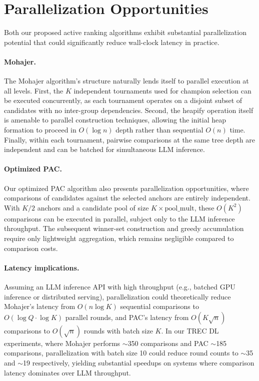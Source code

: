 \documentclass[11pt]{article}
\begin{document}
\section{Parallelization Opportunities}
\label{sec:parallelization}

Both our proposed active ranking algorithms exhibit substantial parallelization potential that could significantly reduce wall-clock latency in practice.

\paragraph{Mohajer.}
The Mohajer algorithm's structure naturally lends itself to parallel execution at all levels.
First, the $K$ independent tournaments used for champion selection can be executed concurrently, as each tournament operates on a disjoint subset of candidates with no inter-group dependencies.
Second, the heapify operation itself is amenable to parallel construction techniques, allowing the initial heap formation to proceed in $O(\log n)$ depth rather than sequential $O(n)$ time.
Finally, within each tournament, pairwise comparisons at the same tree depth are independent and can be batched for simultaneous LLM inference.

\paragraph{Optimized PAC.}
Our optimized PAC algorithm also presents parallelization opportunities, where comparisons of candidates against the selected anchors are entirely independent.
With $K/2$ anchors and a candidate pool of size $K \times \text{pool\_mult}$, these $O(K^2)$ comparisons can be executed in parallel, subject only to the LLM inference throughput.
The subsequent winner-set construction and greedy accumulation require only lightweight aggregation, which remains negligible compared to comparison costs.

\paragraph{Latency implications.}
Assuming an LLM inference API with high throughput (e.g., batched GPU inference or distributed serving), parallelization could theoretically reduce Mohajer's latency from $O(n \log K)$ sequential comparisons to $O(\log Q \cdot \log K)$ parallel rounds, and PAC's latency from $O(K \sqrt{n})$ comparisons to $O(\sqrt{n})$ rounds with batch size $K$.
In our TREC DL experiments, where Mohajer performs $\sim$350 comparisons and PAC $\sim$185 comparisons, parallelization with batch size 10 could reduce round counts to $\sim$35 and $\sim$19 respectively, yielding substantial speedups on systems where comparison latency dominates over LLM throughput.
\end{document}

